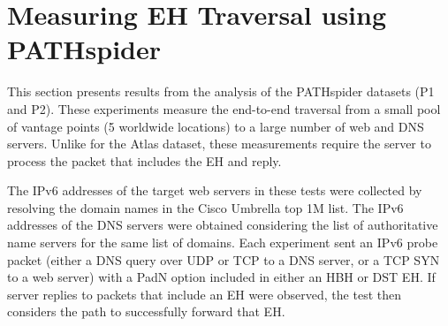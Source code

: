 \documentclass[conference]{IEEEtran}
\begin{document}

\section{Measuring EH Traversal using PATHspider} 
\label{sec:pathspider-results}

This section presents results from the analysis of the PATHspider datasets (P1 and P2).
These experiments measure the end-to-end traversal from a small
pool of vantage points (5 worldwide locations) to a large number of web and
DNS servers.  Unlike for the Atlas dataset, these
measurements require the server to process the packet that includes the EH and reply.

The IPv6 addresses of the target web servers in these tests were collected by
resolving the domain names in the Cisco Umbrella top 1M list. The IPv6
addresses of the DNS servers were obtained considering the list of
authoritative name servers for the same list of domains.
Each experiment sent an IPv6 probe packet (either a DNS
query over UDP or TCP to a DNS server, or a TCP SYN to a web server) with a PadN option included in either an HBH or DST EH. If server replies to packets that include an EH were observed, the test then considers the path to successfully forward that EH.

\end{document}
